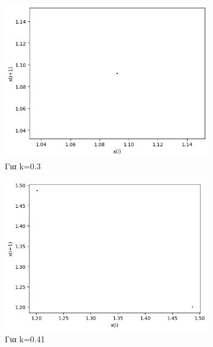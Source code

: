 \begin{figure}[h!]
	\centering
	\caption{Διαγράμματα της τιμής \(x_i\) με την τιμή \(x_{i+1}\) :}
	\begin{subfigure}[b]{0.25\textwidth}
		\centering
		\includegraphics[width=\textwidth]{LateX images/graphs/k03}
		\caption{Για k=0.3}
		\label{f:k1}
	\end{subfigure}
	\hfill
	\begin{subfigure}[b]{0.25\textwidth}
		\centering
		\includegraphics[width=\textwidth]{LateX images/graphs/k041}
		\caption{Για k=0.41}
		\label{f:k2}
	\end{subfigure}
	\hfill
	\begin{subfigure}[b]{0.25\textwidth}
		\centering

\end{subfigure}
\end{figure}
